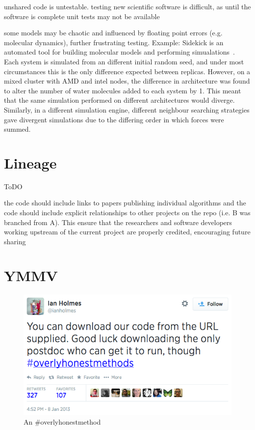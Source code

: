 \documentclass[conference]{IEEEtran}
\begin{document}
unshared code is untestable.  testing new scientific software is
difficult, as until the software is complete unit tests may not be
available

some models may be chaotic and influenced by floating point errors
(e.g. molecular dynamics), further frustrating testing. Example:
Sidekick is an automated tool for building molecular models and
performing simualations~\cite{Hall2014Sidekick}. Each system is
simulated from an different initial random seed, and under most
circumstances this is the only difference expected between
replicas. However, on a mixed cluster with AMD and intel nodes, the
difference in architecture was found to alter the number of water
molecules added to each system by 1. This meant that the same
simulation performed on different architectures would
diverge. Similarly, in a different simulation engine, different
neighbour searching strategies gave divergent simulations due to the
differing order in which forces were summed.



\section{Lineage} 

ToDO 

the code should include links to papers publishing individual
algorithms and the code should include explicit relationships to other
projects on the repo (i.e. B was branched from A). This ensure that
the researchers and software developers working upstream of the
current project are properly credited, encouraging future sharing


\section{YMMV}

\begin{figure}[!ht]
\centering
\includegraphics[width=\columnwidth]{overlyhonesttweet.png}
\caption{An \#overlyhonestmethod}
\label{fig:overlyhonestmethod} 
\end{figure}
\end{document}
